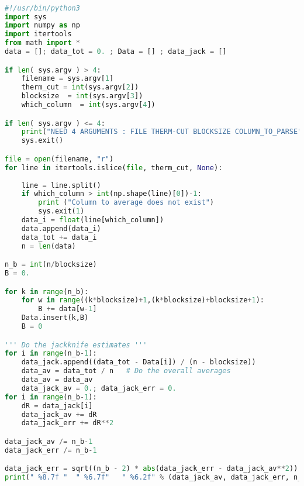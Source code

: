 \begin{footnotesize} 
\begin{lstlisting}[language=Python]

#!/usr/bin/python3
import sys
import numpy as np
import itertools 
from math import *
data = []; data_tot = 0. ; Data = [] ; data_jack = []

if len( sys.argv ) > 4:
    filename = sys.argv[1]
    therm_cut = int(sys.argv[2])
    blocksize  = int(sys.argv[3])
    which_column  = int(sys.argv[4])

if len( sys.argv ) <= 4:
    print("NEED 4 ARGUMENTS : FILE THERM-CUT BLOCKSIZE COLUMN_TO_PARSE")
    sys.exit()

file = open(filename, "r")
for line in itertools.islice(file, therm_cut, None):
    
    line = line.split()
    if which_column > int(np.shape(line)[0])-1:
        print ("Column to average does not exist")
        sys.exit(1)
    data_i = float(line[which_column])
    data.append(data_i)
    data_tot += data_i
    n = len(data)

n_b = int(n/blocksize)
B = 0.

for k in range(n_b):
    for w in range((k*blocksize)+1,(k*blocksize)+blocksize+1):
        B += data[w-1]
    Data.insert(k,B)
    B = 0

''' Do the jackknife estimates '''
for i in range(n_b-1):
    data_jack.append((data_tot - Data[i]) / (n - blocksize))
    data_av = data_tot / n   # Do the overall averages
    data_av = data_av
    data_jack_av = 0.; data_jack_err = 0.
for i in range(n_b-1):
    dR = data_jack[i]
    data_jack_av += dR
    data_jack_err += dR**2

data_jack_av /= n_b-1
data_jack_err /= n_b-1

data_jack_err = sqrt((n_b - 2) * abs(data_jack_err - data_jack_av**2))
print(" %8.7f "  " %6.7f"   " %6.2f" % (data_jack_av, data_jack_err, n_b))
\end{lstlisting}
\end{footnotesize} 